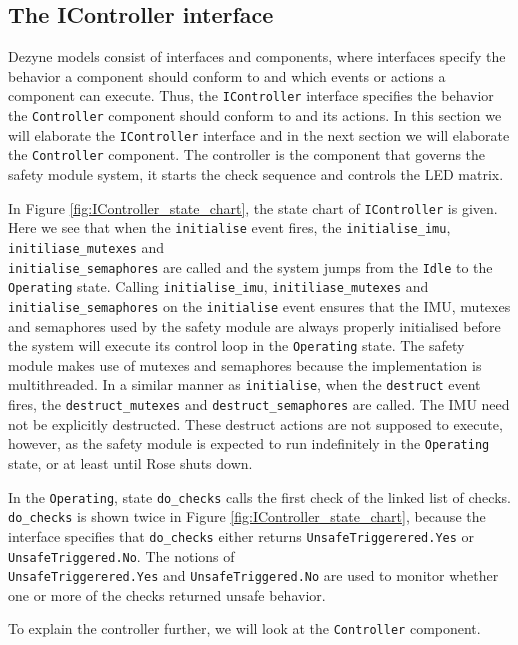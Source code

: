 \documentclass[12pt]{scrreprt}
\begin{document}
\subsection{The IController interface}
\label{secIController}
Dezyne models consist of interfaces and components, where interfaces specify the behavior a component should conform to and which events or actions a component can execute. Thus, the \texttt{IController} interface specifies the behavior the \texttt{Controller} component should conform to and its actions. In this section we will elaborate the \texttt{IController} interface and in the next section we will elaborate the \texttt{Controller} component. The controller is the component that governs the safety module system, it starts the check sequence and controls the LED matrix.
\par
In Figure \ref{fig:IController_state_chart}, the state chart of \texttt{IController} is given. Here we see that when the \texttt{initialise} event fires, the \texttt{initialise\_imu}, \texttt{initiliase\_mutexes} and\\\texttt{initialise\_semaphores} are called and the system jumps from the \texttt{Idle} to the \texttt{Operating} state. Calling \texttt{initialise\_imu}, \texttt{initiliase\_mutexes} and \texttt{initialise\_semaphores} on the \texttt{initialise} event ensures that the IMU, mutexes and semaphores used by the safety module are always properly initialised before the system will execute its control loop in the \texttt{Operating} state. The safety module makes use of mutexes and semaphores because the implementation is multithreaded. In a similar manner as \texttt{initialise}, when the \texttt{destruct} event fires, the \texttt{destruct\_mutexes} and \texttt{destruct\_semaphores} are called. The IMU need not be explicitly destructed. These destruct actions are not supposed to execute, however, as the safety module is expected to run indefinitely in the \texttt{Operating} state, or at least until Rose shuts down.
\par
In the \texttt{Operating}, state \texttt{do\_checks} calls the first check of the linked list of checks. \texttt{do\_checks} is shown twice in Figure \ref{fig:IController_state_chart}, because the interface specifies that \texttt{do\_checks} either returns \texttt{UnsafeTriggerered.Yes} or \texttt{UnsafeTriggered.No}. The notions of\\\texttt{UnsafeTriggerered.Yes} and \texttt{UnsafeTriggered.No} are used to monitor whether one or more of the checks returned unsafe behavior.
\par
To explain the controller further, we will look at the \texttt{Controller} component.
\end{document}
